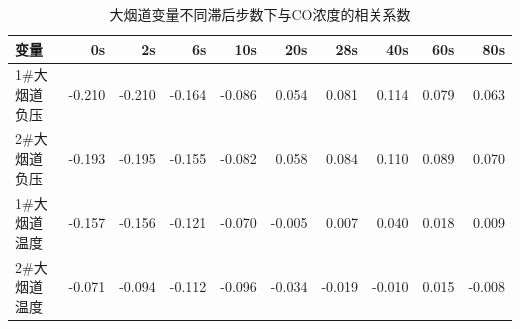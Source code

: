 \documentclass[UTF8,a4paper,zihao=-4]{ctexart}
\newcommand{\CO}{CO}
\begin{document}
\begin{table}[H]
\centering
\caption{大烟道变量不同滞后步数下与\CO 浓度的相关系数}
\begin{tabular}{lrrrrrrrrr}
\toprule
变量 & 0s & 2s & 6s & 10s & 20s & 28s & 40s & 60s & 80s \\
\midrule
1\#大烟道负压 & -0.210 & -0.210 & -0.164 & -0.086 & 0.054 & 0.081 & 0.114 & 0.079 & 0.063 \\
2\#大烟道负压 & -0.193 & -0.195 & -0.155 & -0.082 & 0.058 & 0.084 & 0.110 & 0.089 & 0.070 \\
1\#大烟道温度 & -0.157 & -0.156 & -0.121 & -0.070 & -0.005 & 0.007 & 0.040 & 0.018 & 0.009 \\
2\#大烟道温度 & -0.071 & -0.094 & -0.112 & -0.096 & -0.034 & -0.019 & -0.010 & 0.015 & -0.008 \\
\bottomrule
\end{tabular}
\end{table}
\end{document}
